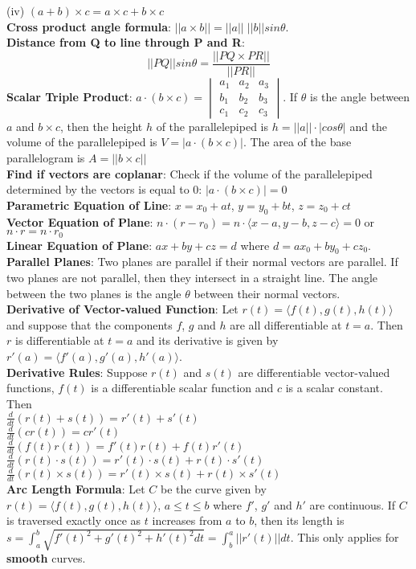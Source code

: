 \documentclass{article}
\begin{document}
\begin{multicols*}{3}
(iv) $(a+b)\times c = a\times c + b\times c$\\
\textbf{Cross product angle formula}: $||a \times b|| = ||a|| \; ||b|| sin \theta$. \\
\textbf{Distance from Q to line through P and R}: $$||PQ||sin\theta=\frac{||PQ\times PR||}{||PR||}$$ 
\textbf{Scalar Triple Product}: $a\cdot(b\times c)=\begin{vmatrix}a_1 & a_2 & a_3 \\ b_1 & b_2 & b_3 \\ c_1 & c_2 & c_3 \end{vmatrix}$. If $\theta$ is the angle between $a$ and $b\times c$, then the height $h$ of the parallelepiped is $h=||a|| \cdot|cos\theta|$ and the volume of the parallelepiped is $V=|a\cdot(b\times c)|$. The area of the base parallelogram is $A=||b\times c||$ \\
\textbf{Find if vectors are coplanar}: Check if the volume of the parallelepiped determined by the vectors is equal to 0: $|a\cdot (b\times c)| = 0$\\
\textbf{Parametric Equation of Line}: $x=x_0+at$, $y=y_0+bt$, $z=z_0+ct$\\ 
\textbf{Vector Equation of Plane}: $n\cdot (r-r_0)=n\cdot \langle x-a,y-b,z-c \rangle=0$ or $n\cdot r=n\cdot r_0$\\
\textbf{Linear Equation of Plane}: $ax+by+cz=d$ where $d=ax_0+by_0+cz_0$.\\
\textbf{Parallel Planes}: Two planes are parallel if their normal vectors are parallel. If two planes are not parallel, then they intersect in a straight line. The angle between the two planes is the angle $\theta$ between their normal vectors. \\
\textbf{Derivative of Vector-valued Function}: Let $r(t) = \langle f(t),g(t),h(t)\rangle$ and suppose that the components $f$, $g$ and $h$ are all differentiable at $t = a$. Then $r$ is differentiable at $t = a$ and its derivative is given by $r'(a) = \langle f'(a), g'(a), h'(a)\rangle$.\\
\textbf{Derivative Rules}: Suppose $r(t)$ and $s(t)$ are differentiable vector-valued functions, $f(t)$ is a differentiable scalar function and $c$ is a scalar constant. Then\\
$\frac{d}{dt}(r(t)+s(t))=r'(t)+s'(t)$\\
$\frac{d}{dt}(cr(t))=cr'(t)$\\
$\frac{d}{dt}(f(t)r(t))=f'(t)r(t)+f(t)r'(t)$\\
$\frac{d}{dt}(r(t)\cdot s(t))=r'(t)\cdot s(t)+r(t)\cdot s'(t)$\\
$\frac{d}{dt}(r(t) \times  s(t))=r'(t) \times s(t)+r(t) \times s'(t)$\\
\textbf{Arc Length Formula}: Let $C$ be the curve given by $r(t) =\langle f(t),g(t),h(t)\rangle$, $a \leq t \leq b$ where $f'$, $g'$ and $h'$ are continuous. If $C$ is traversed exactly once as $t$ increases from $a$ to $b$, then its length is $s=\int_a^b\sqrt{f'(t)^2+g'(t)^2+h'(t)^2 dt}=\int_b^a||r'(t)||dt$. This only applies for \textbf{smooth} curves. 

\end{multicols*}
\end{document}
